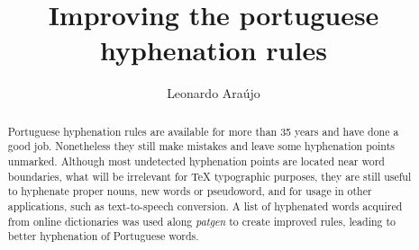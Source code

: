 \documentclass{article}
\title{Improving the portuguese hyphenation rules}
\author{Leonardo Araújo}
\begin{document}
\maketitle







\begin{abstract}
    Portuguese hyphenation rules are available for more than 35
    years and have done a good job. Nonetheless they still make mistakes and
    leave some hyphenation points unmarked. Although most undetected
    hyphenation points are located near word boundaries, what will be
    irrelevant for \TeX{} typographic purposes, they are still useful to
    hyphenate proper nouns, new words or pseudoword, and for usage in other
    applications, such as text-to-speech conversion. A list of
    \DictionarySize{} hyphenated words acquired from online dictionaries was
    used along \emph{patgen} to create improved rules, leading to better hyphenation
    of Portuguese words.
\end{abstract}
\end{document}
